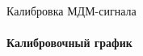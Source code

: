 \documentclass[14pt]{beamer}
\begin{document}
\begin{frame}{Калибровка МДМ-сигнала}
	\framesubtitle{Калибровочный график}
	\centering
\end{frame}
\end{document}

